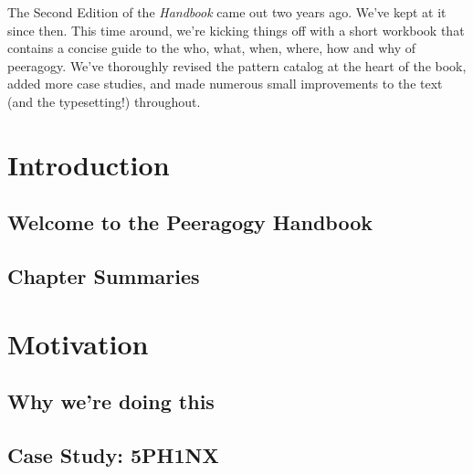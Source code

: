 \documentclass[ebook,12pt, twoside]{memoir}
\begin{document}
The Second Edition of the \emph{Handbook} came out two years ago.
We've kept at it since then.  This time around, we're kicking things
off with a short workbook that contains a concise guide to the who,
what, when, where, how and why of peeragogy.  We've thoroughly revised
the pattern catalog at the heart of the book, added more case studies,
and made numerous small improvements to the text (and the
typesetting!)  throughout.

\clearpage

\mainmatter

\part{Introduction} \label{intro-part} %
\pagestyle{companion}
\chapter[\textbf{Welcome!}]{Welcome to the Peeragogy Handbook}
%


\newpage




\chapter[\textbf{Chapter Summaries}]{Chapter Summaries}
%


\part{Motivation} \label{motivation-part} %
%
\chapter[\textbf{Why we're doing this}]{Why we're doing this}

%
\chapter[\textbf{Case Study: 5PH1NX}]{Case Study: 5PH1NX}\label{sphinx-beginning}
%

\end{document}
